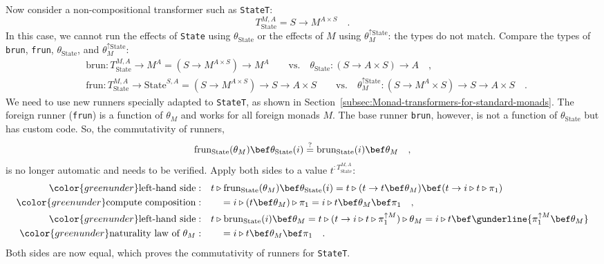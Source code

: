 Now consider a non-compositional transformer such as \lstinline!StateT!:
\[
T_{\text{State}}^{M,A}=S\rightarrow M^{A\times S}\quad.
\]
In this case, we cannot run the effects of \lstinline!State! using
$\theta_{\text{State}}$ or the effects of $M$ using $\theta_{M}^{\uparrow\text{State}}$:
the types do not match. Compare the types of \lstinline!brun!, \lstinline!frun!,
$\theta_{\text{State}}$, and $\theta_{M}^{\uparrow\text{State}}$:
\begin{align*}
 & \text{brun}:T_{\text{State}}^{M,A}\rightarrow M^{A}=(S\rightarrow M^{A\times S})\rightarrow M^{A}\quad\quad\text{vs.}\quad\theta_{\text{State}}:\left(S\rightarrow A\times S\right)\rightarrow A\quad,\\
 & \text{frun}:T_{\text{State}}^{M,A}\rightarrow\text{State}^{S,A}=(S\rightarrow M^{A\times S})\rightarrow S\rightarrow A\times S\quad\quad\text{vs.}\quad\theta_{M}^{\uparrow\text{State}}:(S\rightarrow M^{A}\times S)\rightarrow S\rightarrow A\times S\quad.
\end{align*}
We need to use new runners specially adapted to \lstinline!StateT!,
as shown in Section~\ref{subsec:Monad-transformers-for-standard-monads}.
The foreign runner (\lstinline!frun!) is a function of $\theta_{M}$
and works for all foreign monads $M$. The base runner \lstinline!brun!,
however, is not a function of $\theta_{\text{State}}$ but has custom
code. So, the commutativity of runners,
\[
\text{frun}_{\text{State}}(\theta_{M})\bef\theta_{\text{State}}(i)\overset{?}{=}\text{brun}_{\text{State}}(i)\bef\theta_{M}\quad,
\]
is no longer automatic and needs to be verified. Apply both sides
to a value $t^{:T_{\text{State}}^{M,A}}$:
\begin{align*}
{\color{greenunder}\text{left-hand side}:}\quad & t\triangleright\text{frun}_{\text{State}}(\theta_{M})\bef\theta_{\text{State}}(i)=t\triangleright(t\rightarrow t\bef\theta_{M})\bef(t\rightarrow i\triangleright t\triangleright\pi_{1})\\
{\color{greenunder}\text{compute composition}:}\quad & \quad=i\triangleright(t\bef\theta_{M})\triangleright\pi_{1}=i\triangleright t\bef\theta_{M}\bef\pi_{1}\quad,\\
{\color{greenunder}\text{left-hand side}:}\quad & t\triangleright\text{brun}_{\text{State}}(i)\bef\theta_{M}=t\triangleright(t\rightarrow i\triangleright t\triangleright\pi_{1}^{\uparrow M})\triangleright\theta_{M}=i\triangleright t\bef\gunderline{\pi_{1}^{\uparrow M}\bef\theta_{M}}\\
{\color{greenunder}\text{naturality law of }\theta_{M}:}\quad & \quad=i\triangleright t\bef\theta_{M}\bef\pi_{1}\quad.
\end{align*}
Both sides are now equal, which proves the commutativity of runners
for \lstinline!StateT!.

